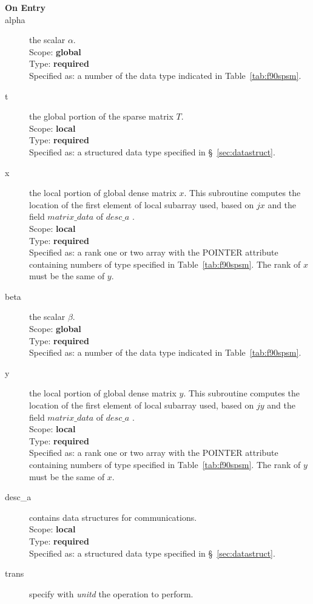 \begin{description}
\item[\bf On Entry]
\item[alpha] the scalar $\alpha$.\\
Scope: {\bf global} \\
Type: {\bf required}\\
Specified as: a number of the data type indicated in
Table~\ref{tab:f90spsm}.
\item[t] the global portion of the sparse matrix
$T$.  \\ 
Scope: {\bf local} \\
Type: {\bf required}\\
Specified as: a structured data type specified in
\S~\ref{sec:datastruct}.
\item[x] the local portion of global dense matrix
$x$. This subroutine computes the location of the first element of
local subarray used, based on $jx$ and the field $matrix\_data$ of $desc\_a$ . \\
Scope: {\bf local} \\
Type: {\bf required} \\
Specified as:  a rank one or two array with the POINTER attribute
containing numbers of type specified in
Table~\ref{tab:f90spsm}.  The rank of $x$ must be the same of $y$. 
\item[beta] the scalar $\beta$.\\
Scope: {\bf global} \\
Type: {\bf required} \\
Specified as: a number of the data type indicated in Table~\ref{tab:f90spsm}.
\item[y] the local portion of global dense matrix
$y$. This subroutine computes the location of the first element of
local subarray used, based on $jy$ and the field $matrix\_data$ of $desc\_a$ . \\
Scope: {\bf local} \\
Type: {\bf required} \\
Specified as:  a rank one or two array with the POINTER attribute
containing numbers of type specified in
Table~\ref{tab:f90spsm}. The rank of $y$ must be the same of $x$. 
\item[desc\_a] contains data structures for communications.\\
Scope: {\bf local} \\
Type: {\bf required}\\
Specified as: a structured data type specified in
\S~\ref{sec:datastruct}.
\item[trans] specify with {\em unitd} the operation to perform.

\end{description}
